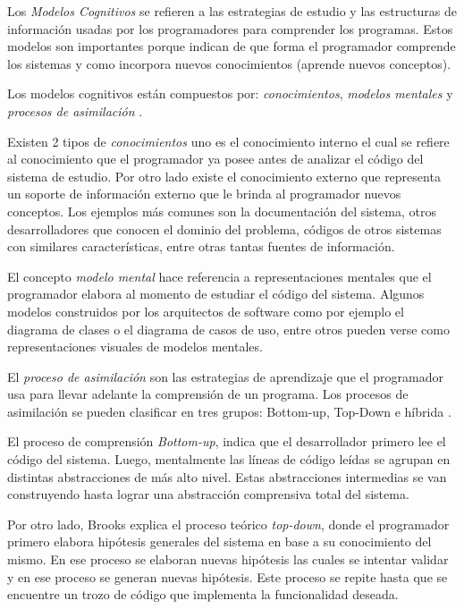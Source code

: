 \documentclass[a4paper,12pt]{report}
\begin{document}
Los \textit{Modelos Cognitivos} se refieren a las estrategias de estudio y las estructuras de información usadas por los programadores para comprender los programas. Estos modelos \cite{TIE89,VMAVA95,BROOK82,STOREY99} son importantes porque indican de que forma el programador comprende los sistemas y como incorpora nuevos conocimientos (aprende nuevos conceptos). 

Los modelos cognitivos están compuestos por: \textit{conocimientos}, \textit{modelos mentales} y \textit{procesos de asimilación} \cite{MBPHRU10}.

Existen 2 tipos de \textit{conocimientos} uno es el conocimiento interno el cual se refiere al conocimiento que el programador ya posee antes de analizar el código del sistema de estudio. Por otro lado existe el conocimiento externo que representa un soporte de información externo que le brinda al programador nuevos conceptos. Los ejemplos más comunes son la documentación del sistema, otros desarrolladores que conocen el dominio del problema, códigos de otros sistemas con similares características, entre otras tantas fuentes de información.

El concepto \textit{modelo mental} hace referencia a representaciones mentales que el programador elabora al momento de estudiar el código del sistema. 
Algunos modelos construidos por los arquitectos de software como por ejemplo el diagrama de clases o el diagrama de casos de uso, entre otros pueden verse como representaciones visuales de modelos mentales. 

El \textit{proceso de asimilación} son las estrategias de aprendizaje que el programador usa para llevar adelante la comprensión de un programa. Los procesos de asimilación se pueden clasificar en tres grupos: Bottom-up, Top-Down e híbrida \cite{MPOB03,MAS05}.

El proceso de comprensión \textit{Bottom-up}, indica que el desarrollador primero lee el código del sistema. Luego, mentalmente las líneas de código leídas se agrupan en distintas abstracciones de más alto nivel. Estas abstracciones intermedias se van construyendo hasta lograr una abstracción comprensiva total del sistema.

Por otro lado, Brooks explica el proceso teórico \textit{top-down}, donde el programador primero elabora hipótesis generales del sistema en base a su conocimiento del mismo. En ese proceso se elaboran nuevas hipótesis las cuales se intentar validar y en ese proceso se generan nuevas hipótesis.
Este proceso se repite hasta que se encuentre un trozo de código que implementa la funcionalidad deseada.
\end{document}
